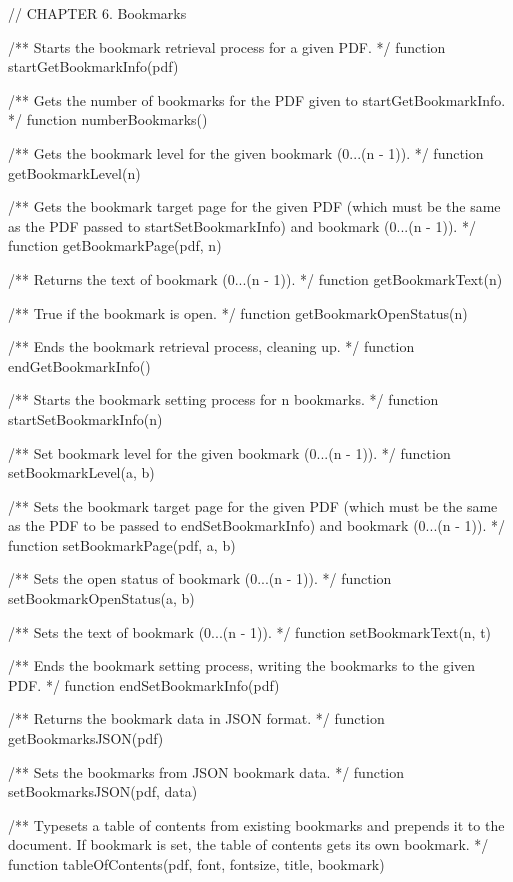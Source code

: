 // CHAPTER 6. Bookmarks

/** Starts the bookmark retrieval process for a given PDF. */
function startGetBookmarkInfo(pdf)

/** Gets the number of bookmarks for the PDF given to startGetBookmarkInfo. */
function numberBookmarks()

/** Gets the bookmark level for the given bookmark (0...(n - 1)). */
function getBookmarkLevel(n)

/** Gets the bookmark target page for the given PDF (which must be the same
as the PDF passed to startSetBookmarkInfo) and bookmark (0...(n - 1)). */
function getBookmarkPage(pdf, n)

/** Returns the text of bookmark (0...(n - 1)). */
function getBookmarkText(n)

/** True if the bookmark is open. */
function getBookmarkOpenStatus(n)

/** Ends the bookmark retrieval process, cleaning up. */
function endGetBookmarkInfo()

/** Starts the bookmark setting process for n bookmarks. */
function startSetBookmarkInfo(n)

/** Set bookmark level for the given bookmark (0...(n - 1)). */
function setBookmarkLevel(a, b)

/** Sets the bookmark target page for the given PDF (which must be the same as
the PDF to be passed to endSetBookmarkInfo) and bookmark (0...(n - 1)). */
function setBookmarkPage(pdf, a, b)

/** Sets the open status of bookmark (0...(n - 1)). */
function setBookmarkOpenStatus(a, b)

/** Sets the text of bookmark (0...(n - 1)). */
function setBookmarkText(n, t)

/** Ends the bookmark setting process, writing the bookmarks to the given
PDF. */
function endSetBookmarkInfo(pdf)

/** Returns the bookmark data in JSON format. */
function getBookmarksJSON(pdf)

/** Sets the bookmarks from JSON bookmark data. */
function setBookmarksJSON(pdf, data)

/** Typesets a table of contents from existing bookmarks and prepends it to
the document. If bookmark is set, the table of contents gets its own
bookmark. */
function tableOfContents(pdf, font, fontsize, title, bookmark)
